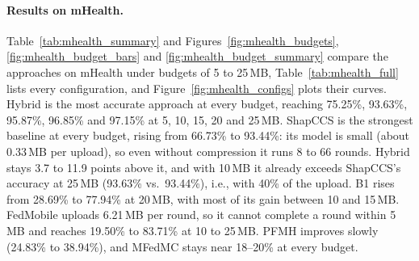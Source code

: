 \documentclass[sigconf]{acmart}
\newcommand{\method}{Hybrid}   %
\begin{document}
\paragraph{Results on mHealth.}
Table~\ref{tab:mhealth_summary} and
Figures~\ref{fig:mhealth_budgets}, \ref{fig:mhealth_budget_bars} and
\ref{fig:mhealth_budget_summary} compare the approaches on mHealth under
budgets of 5 to 25\,MB, Table~\ref{tab:mhealth_full} lists every
configuration, and Figure~\ref{fig:mhealth_configs} plots their curves. \method{} is the most accurate approach at every budget, reaching
75.25\%, 93.63\%, 95.87\%, 96.85\% and 97.15\% at 5, 10, 15, 20 and 25\,MB.
ShapCCS is the strongest baseline at every budget, rising from 66.73\% to
93.44\%: its model is small (about 0.33\,MB per upload), so even without
compression it runs 8 to 66 rounds. \method{} stays 3.7 to 11.9 points above it,
and with 10\,MB it already exceeds ShapCCS's accuracy at 25\,MB (93.63\% vs.\
93.44\%), i.e., with 40\% of the upload. B1 rises from 28.69\% to 77.94\% at
20\,MB, with most of its gain between 10 and 15\,MB. FedMobile uploads 6.21\,MB
per round, so it cannot complete a round within 5\,MB and reaches 19.50\% to
83.71\% at 10 to 25\,MB. PFMH improves slowly (24.83\% to 38.94\%), and MFedMC
stays near 18--20\% at every budget.
\end{document}
